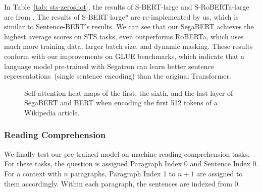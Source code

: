 \documentclass[letterpaper]{article}
\begin{document}
In Table~\ref{tab: sts-zeroshot}, the results of S-BERT-large and S-RoBERTa-large are from \citet{DBLP:conf/emnlp/sbert}. 
The results of S-BERT-large* are re-implemented by us, which is similar to Sentence-BERT's results.
We can see that our SegaBERT achieves the highest average scores on STS tasks, even outperforms RoBERTa, which uses much more training data, larger batch size, and dynamic masking.
These results conform with our improvements on GLUE benchmarks, which indicate that a language model pre-trained with Segatron can learn better sentence representations~(single sentence encoding) than the original Transformer.

\begin{figure*}[t]
  \centering


  
  \caption{Self-attention heat maps of the first, the sixth, and the last layer of SegaBERT and BERT when encoding the first 512 tokens of a Wikipedia article.}
  \label{fig:heatmap}
\end{figure*} 
\subsubsection{Reading Comprehension}
We finally test our pre-trained model on machine reading comprehension tasks.
For these tasks, the question is assigned Paragraph Index 0 and Sentence Index 0.
For a context with $n$ paragraphs, Paragraph Index 1 to $n+1$ are assigned to them accordingly.
Within each paragraph, the sentences are indexed from 0.
\end{document}
